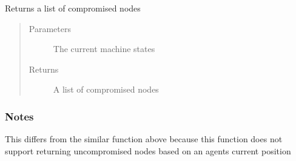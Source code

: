 \documentclass[letterpaper,10pt,english]{sphinxmanual}
\begin{document}
\begin{fulllineitems}
\label{\detokenize{source/yawning_titan.envs.specific.core:yawning_titan.envs.specific.core.node_states.get_compromised_nodes}}
\sphinxAtStartPar
Returns a list of compromised nodes
\begin{quote}\begin{description}
\item[{Parameters}] \leavevmode
\sphinxAtStartPar
{} \textendash{} The current machine states

\item[{Returns}] \leavevmode
\sphinxAtStartPar
A list of compromised nodes

\end{description}\end{quote}
\subsubsection*{Notes}

\sphinxAtStartPar
This differs from the similar function above
because this function does not support returning
uncompromised nodes based on an agents current
position

\end{fulllineitems}

\end{document}
